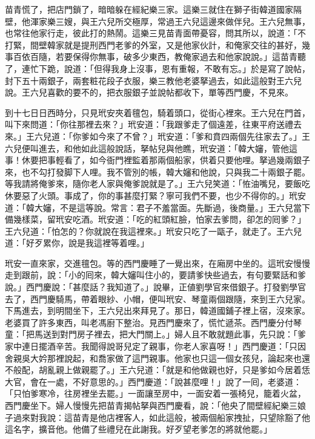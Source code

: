 苗青慌了，把店門鎖了，暗暗躲在經紀樂三家。這樂三就住在獅子街韓道國家隔壁，他渾家樂三嫂，與王六兒所交極厚，常過王六兒這邊來做伴兒。王六兒無事，也常往他家行走，彼此打的熱鬧。這樂三見苗青面帶憂容，問其所以，說道：「不打緊，間壁韓家就是提刑西門老爹的外室，又是他家伙計，和俺家交往的甚好，幾事百依百隨，若要保得你無事，破多少東西，教俺家過去和他家說說。」這苗青聽了，連忙下跪，說道：「但得我身上沒事，恩有重報，不敢有忘。」於是寫了說帖，封下五十兩銀子，兩套粧花段子衣服，樂三教他老婆拏過去，如此這般對王六兒說。王六兒喜歡的要不的，把衣服銀子並說帖都收下，單等西門慶，不見來。

到十七日日西時分，只見玳安夾着氊包，騎着頭口，從街心裡來。王六兒在門首，叫下來問道：「你往那裡去來？」玳安道：「我跟爹走了個遠差，往東平府送禮去來。」王六兒道：「你爹如今來了不曾？」玳安道：「爹和賁四兩個先往家去了。」王六兒便叫進去，和他如此這般說話，拏帖兒與他瞧，玳安道：「韓大嬸，管他這事！休要把事輕看了，如今衙門裡監着那兩個船家，供着只要他哩。拏過幾兩銀子來，也不勾打發脚下人哩。我不管別的帳，韓大嬸和他說，只與我二十兩銀子罷。等我請將俺爹來，隨你老人家與俺爹說就是了。」王六兒笑道：「恠油嘴兒，要飯吃休要惡了火頭。事成了，你的事甚麼打緊？寧可我們不要，也少不得你的。」玳安道：「韓大嬸，不是這等說。常言：君子不羞當面。先斷過，後商量。」王六兒當下備幾樣菜，留玳安吃酒。玳安道：「吃的紅頭紅臉，怕家去爹問，卻怎的囘爹？」王六兒道：「怕怎的？你就說在我這裡來。」玳安只吃了一甌子，就走了。王六兒道：「好歹累你，說是我這裡等着哩。」

玳安一直來家，交進氊包。等的西門慶睡了一覺出來，在廂房中坐的。這玳安慢慢走到跟前，說：「小的囘來，韓大嬸叫住小的，要請爹快些過去，有句要緊話和爹說。」西門慶說：「甚麼話？我知道了。」說畢，正値劉學官來借銀子。{}打發劉學官去了，西門慶騎馬，帶着眼紗、小帽，便叫玳安、琴童兩個跟隨，來到王六兒家。下馬進去，到明間坐下，王六兒出來拜見了。那日，韓道國鋪子裡上宿，沒來家。老婆買了許多東西，叫老馮廚下整治。見西門慶來了，慌忙遞茶。西門慶分付琴童：「把馬送到對門房子裡去，把大門關上。」婦人且不敢就題此事，先只說：「爹家中連日擺酒辛苦。我聞得說哥兒定了親事，你老人家喜呀！」西門慶道：「只因舍親吳大妗那裡說起，和喬家做了這門親事。他家也只這一個女孩兒，論起來也還不般配，胡亂親上做親罷了。」王六兒道：「就是和他做親也好，只是爹如今居着恁大官，會在一處，不好意思的。」西門慶道：「說甚麼哩！」說了一囘，老婆道：「只怕爹寒冷，往房裡坐去罷。」一面讓至房中，一面安着一張椅兒，籠着火盆，西門慶坐下。婦人慢慢先把苗青揭帖拏與西門慶看，說：「他央了間壁經紀樂三娘子過來對我說：這苗青是他店裡客人，如此這般，被兩個船家拽扯，只望除豁了他這名字，擴音他。他備了些禮兒在此謝我。好歹望老爹怎的將就他罷。」

